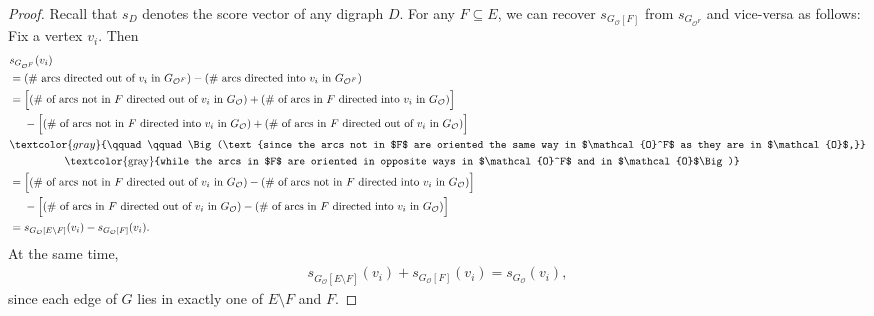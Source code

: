 \documentclass[12pt]{article}
\theoremstyle{definition}
\theoremstyle{remark}
\newcommand{\Or}{\mathcal{O}}
\begin{document}
\begin{proof}
    Recall that $s_D$ denotes the score vector of any digraph $D$. For any $F \subseteq E$, we can recover $s_{G_{\mathcal{O}}[F]}$ from $s_{G_{\mathcal{O}^F}}$ and vice-versa as follows: Fix a vertex $v_i$. Then \begin{align*}
        & s_{G_{\mathcal{O}^F}}(v_i) \\
		&= (\# \text{ arcs directed out of $v_i$ in $G_{\mathcal{O}^F}$}) - (\# \text{ arcs directed into $v_i$ in $G_{\mathcal{O}^F}$})
		\\
		&= \Big[(\# \text{ of arcs not in $F$ directed out of $v_i$ in $G_{\mathcal{O}}$}) + (\# \text{ of arcs in $F$ directed into $v_i$ in $G_{\mathcal{O}}$}) \Big] \\
        & \ \ \ \ - \Big[(\# \text{ of arcs not in $F$ directed into $v_i$ in $G_{\mathcal{O}}$}) + (\# \text{ of arcs in $F$ directed out of $v_i$ in $G_{\mathcal{O}}$})\Big] \\
		& \textcolor{gray}{\qquad \qquad \Big(\text{since the arcs not in $F$ are oriented the same way in $\Or^F$ as they are in $\Or$,}}\\
		& \qquad \qquad \quad \text{\textcolor{gray}{while the arcs in $F$ are oriented in opposite ways in $\Or^F$ and in $\Or$\Big)}} \\
        &= \Big[ (\# \text{ of arcs not in $F$ directed out of $v_i$ in $G_{\mathcal{O}}$}) - (\# \text{ of arcs not in $F$ directed into $v_i$ in $G_{\mathcal{O}}$)}\Big] \\
        & \ \ \ \ -\Big[ (\# \text{ of arcs in $F$ directed out of $v_i$ in $G_{\mathcal{O}}$}) - (\# \text{ of arcs in $F$ directed into $v_i$ in $G_{\mathcal{O}}$)}\Big] \\
        &= s_{G_{\mathcal{O}}[E \setminus F]}(v_i) - s_{G_{\mathcal{O}}[F]}(v_i).
    \end{align*}
    At the same time, \begin{align*}
        s_{G_{\mathcal{O}}[E\setminus F]}(v_i) + s_{G_{\mathcal{O}}[F]}(v_i) = s_{G_{\mathcal{O}}}(v_i),
    \end{align*} since each edge of $G$ lies in exactly one of $E \setminus F$ and $F$. %

\end{proof}
\end{document}
